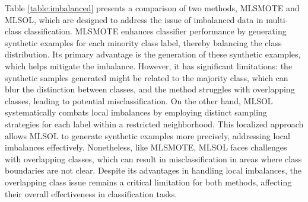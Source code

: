 Table \ref{table:imbalanced}  presents a comparison of two methods, MLSMOTE and MLSOL, which are designed to address the issue of imbalanced data in multi-class classification. MLSMOTE enhances classifier performance by generating synthetic examples for each minority class label, thereby balancing the class distribution. Its primary advantage is the generation of these synthetic examples, which helps mitigate the imbalance. However, it has significant limitations: the synthetic samples generated might be related to the majority class, which can blur the distinction between classes, and the method struggles with overlapping classes, leading to potential misclassification. On the other hand, MLSOL systematically combats local imbalances by employing distinct sampling strategies for each label within a restricted neighborhood. This localized approach allows MLSOL to generate synthetic examples more precisely, addressing local imbalances effectively. Nonetheless, like MLSMOTE, MLSOL faces challenges with overlapping classes, which can result in misclassification in areas where class boundaries are not clear. Despite its advantages in handling local imbalances, the overlapping class issue remains a critical limitation for both methods, affecting their overall effectiveness in classification tasks.
